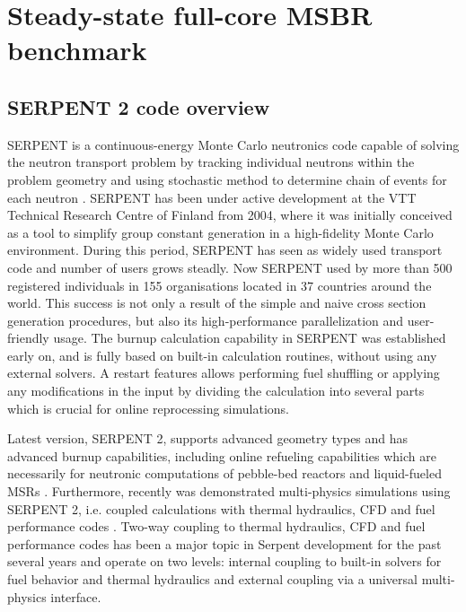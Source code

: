 \chapter[Steady-state full-core MSBR benchmark]{Steady-state full-core MSBR benchmark}

\section{SERPENT 2 code overview}

SERPENT is a continuous-energy Monte Carlo neutronics code capable of solving the neutron transport problem by tracking individual neutrons within the problem geometry and using stochastic method to determine chain of events for each neutron \cite{leppanen_serpent_2015}. SERPENT has been under active development at the VTT Technical Research Centre of Finland from 2004, where it was initially conceived as a tool to simplify group constant generation in a high-fidelity Monte Carlo environment. During this period, SERPENT has seen as widely used transport code and number of users grows steadly. Now SERPENT used by more than 500 registered individuals in 155 organisations located in 37 countries around the world. This success is not only a result of the simple and naive cross section generation procedures, but also its high-performance parallelization and user-friendly usage. The burnup calculation capability in SERPENT was established early on, and is fully based on built-in calculation routines, without using any external solvers. A restart features allows performing fuel shuffling or applying any modifications in the input by dividing the calculation into several parts which is crucial for online reprocessing simulations.

Latest version, SERPENT 2, supports advanced geometry types and has advanced burnup capabilities, including online refueling capabilities which are necessarily for neutronic computations of pebble-bed reactors and liquid-fueled \glspl{MSR} \cite{aufiero_extended_2013}. Furthermore, recently was demonstrated multi-physics simulations using SERPENT 2, i.e. coupled calculations with thermal hydraulics, \gls{CFD} and fuel performance codes \cite{leppanen_numerical_2015}. Two-way coupling to thermal hydraulics, CFD and fuel performance codes has been a major topic in Serpent development for the past several years and operate on two levels: 	internal coupling to built-in solvers for fuel behavior and thermal hydraulics and external coupling via a universal multi-physics interface. 

